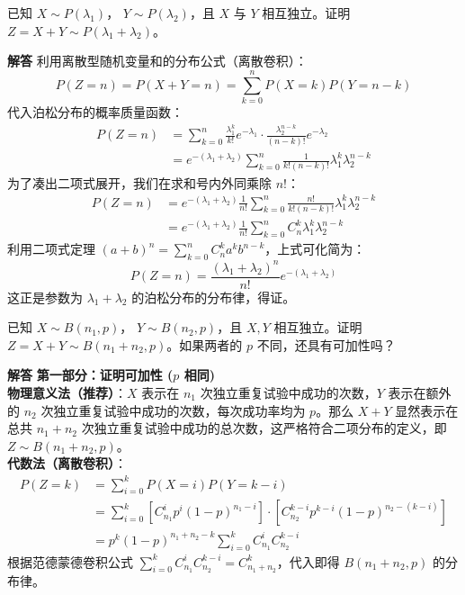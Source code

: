 \begin{例题}[泊松分布的可加性证明]
	已知 $X \sim P(\lambda_1)$， $Y \sim P(\lambda_2)$，且 $X$ 与 $Y$ 相互独立。证明 $Z = X + Y \sim P(\lambda_1 + \lambda_2)$。
\end{例题}
\textbf{解答}\quad
利用离散型随机变量和的分布公式（离散卷积）：
$$ P(Z=n) = P(X+Y=n) = \sum_{k=0}^{n} P(X=k)P(Y=n-k) $$
代入泊松分布的概率质量函数：
$$ 
\begin{aligned}
P(Z=n) &= \sum_{k=0}^{n} \frac{\lambda_1^k}{k!}e^{-\lambda_1} \cdot \frac{\lambda_2^{n-k}}{(n-k)!}e^{-\lambda_2} \\
&= e^{-(\lambda_1+\lambda_2)} \sum_{k=0}^{n} \frac{1}{k!(n-k)!} \lambda_1^k \lambda_2^{n-k}
\end{aligned}
$$
为了凑出二项式展开，我们在求和号内外同乘除 $n!$：
$$ 
\begin{aligned}
P(Z=n) &= e^{-(\lambda_1+\lambda_2)} \frac{1}{n!} \sum_{k=0}^{n} \frac{n!}{k!(n-k)!} \lambda_1^k \lambda_2^{n-k} \\
&= e^{-(\lambda_1+\lambda_2)} \frac{1}{n!} \sum_{k=0}^{n} C_n^k \lambda_1^k \lambda_2^{n-k}
\end{aligned}
$$
利用二项式定理 $(a+b)^n = \sum_{k=0}^{n} C_n^k a^k b^{n-k}$，上式可化简为：
$$ P(Z=n) = \frac{(\lambda_1+\lambda_2)^n}{n!} e^{-(\lambda_1+\lambda_2)} $$
这正是参数为 $\lambda_1 + \lambda_2$ 的泊松分布的分布律，得证。


\vspace{1em}
\begin{例题}[二项分布可加性的条件探究]
	已知 $X \sim B(n_1, p)$， $Y \sim B(n_2, p)$，且 $X, Y$ 相互独立。证明 $Z = X + Y \sim B(n_1+n_2, p)$。如果两者的 $p$ 不同，还具有可加性吗？
\end{例题}
\textbf{解答}\quad
\textbf{第一部分：证明可加性 ($p$ 相同)} \\
\textbf{物理意义法（推荐）}：$X$ 表示在 $n_1$ 次独立重复试验中成功的次数，$Y$ 表示在额外的 $n_2$ 次独立重复试验中成功的次数，每次成功率均为 $p$。那么 $X+Y$ 显然表示在总共 $n_1+n_2$ 次独立重复试验中成功的总次数，这严格符合二项分布的定义，即 $Z \sim B(n_1+n_2, p)$。\\
\textbf{代数法（离散卷积）}：
$$ 
\begin{aligned}
P(Z=k) &= \sum_{i=0}^{k} P(X=i)P(Y=k-i) \\
&= \sum_{i=0}^{k} [C_{n_1}^i p^i (1-p)^{n_1-i}] \cdot [C_{n_2}^{k-i} p^{k-i} (1-p)^{n_2-(k-i)}] \\
&= p^k (1-p)^{n_1+n_2-k} \sum_{i=0}^{k} C_{n_1}^i C_{n_2}^{k-i}
\end{aligned}
$$
根据范德蒙德卷积公式 $\sum_{i=0}^{k} C_{n_1}^i C_{n_2}^{k-i} = C_{n_1+n_2}^k$，代入即得 $B(n_1+n_2, p)$ 的分布律。

